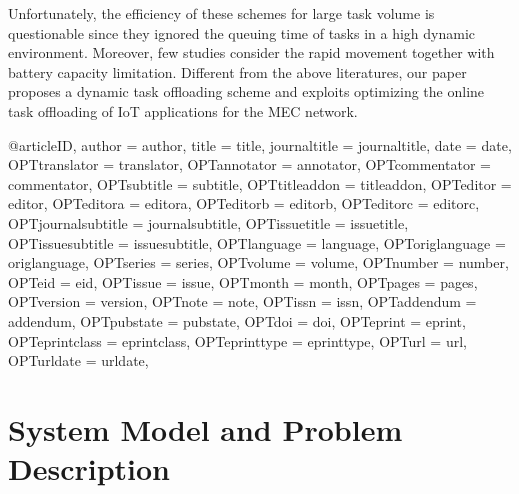 \documentclass[journal,article,submit,pdftex,moreauthors]{Definitions/mdpi}
\begin{document}
Unfortunately, the efficiency of these schemes for large task volume is questionable since they ignored the queuing time of tasks in a high dynamic environment. Moreover, few studies consider the rapid movement together with battery capacity limitation. Different from the above literatures, our paper proposes a dynamic task offloading scheme and exploits 
optimizing the online task offloading of IoT applications for the MEC network.






@article{ID,
	author = {author},
	title = {title},
	journaltitle = {journaltitle},
	date = {date},
	OPTtranslator = {translator},
	OPTannotator = {annotator},
	OPTcommentator = {commentator},
	OPTsubtitle = {subtitle},
	OPTtitleaddon = {titleaddon},
	OPTeditor = {editor},
	OPTeditora = {editora},
	OPTeditorb = {editorb},
	OPTeditorc = {editorc},
	OPTjournalsubtitle = {journalsubtitle},
	OPTissuetitle = {issuetitle},
	OPTissuesubtitle = {issuesubtitle},
	OPTlanguage = {language},
	OPToriglanguage = {origlanguage},
	OPTseries = {series},
	OPTvolume = {volume},
	OPTnumber = {number},
	OPTeid = {eid},
	OPTissue = {issue},
	OPTmonth = {month},
	OPTpages = {pages},
	OPTversion = {version},
	OPTnote = {note},
	OPTissn = {issn},
	OPTaddendum = {addendum},
	OPTpubstate = {pubstate},
	OPTdoi = {doi},
	OPTeprint = {eprint},
	OPTeprintclass = {eprintclass},
	OPTeprinttype = {eprinttype},
	OPTurl = {url},
	OPTurldate = {urldate},
}
\section{System Model and Problem Description}
\end{document}
